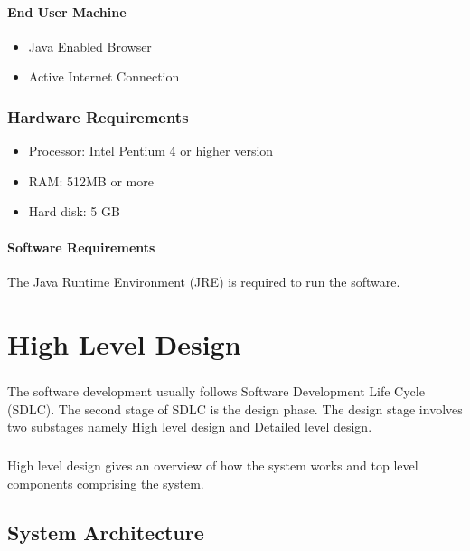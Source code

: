\documentclass[12pt,a4paper]{report}
\begin{document}
\subsubsection{End User Machine}
\begin{itemize}
\item {Java Enabled Browser }
\item { Active Internet Connection }
\end{itemize}
\subsection{Hardware Requirements}
\begin{itemize}
\item{Processor: Intel Pentium 4 or higher version}
\item{RAM: 512MB or more}
\item{Hard disk: 5 GB}
\end{itemize}
\subsubsection{Software Requirements }
The Java Runtime Environment (JRE) is required to run the software.
\pagestyle{fancy}
\chead{}
\rfoot{\small{\thepage}}
\renewcommand{\headrulewidth}{0.4pt}
\renewcommand{\footrulewidth}{0.4pt}
\chapter{High Level Design}
\paragraph{}The software development usually follows Software Development Life Cycle (SDLC). The second stage of SDLC is the design phase. The design stage involves two substages namely High level design and Detailed level design.\\
\paragraph{} High level design gives an overview of how the system works and top level components comprising the system.

\section{System Architecture}
\end{document}

